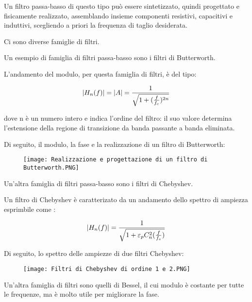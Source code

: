 Un filtro passa-basso di questo tipo può essere sintetizzato, quindi progettato e fisicamente realizzato, assemblando insieme componenti resistivi, capacitivi e induttivi, 
scegliendo a priori la frequenza di taglio desiderata. \newline 

Ci sono diverse famiglie di filtri. \newline 

Un esempio di famiglia di filtri passa-basso sono i filtri di Butterworth. \newline 

L'andamento del modulo, per questa famiglia di filtri, è del tipo: 

{
    \Large 
    \begin{equation}
        \abs{H_n (f)} = \abs{A} = \frac{1}{\sqrt{1+(\frac{f}{f_c})^{2n}}}
    \end{equation}
}

dove n è un numero intero e indica l'ordine del filtro: il suo valore determina l'estensione della regione di transizione da banda passante a banda eliminata. \newline 

Di seguito, il modulo, la fase e la realizzazione di un filtro di Butterworth: 

\begin{figure}[h]
    \centering
    \texttt{[image: Realizzazione e progettazione di un filtro di Butterworth.PNG]}
\end{figure}  

Un'altra famiglia di filtri passa-basso sono i filtri di Chebyshev. \newline 

Un filtro di Chebyshev è caratterizato da un andamento dello spettro di ampiezza esprimbile come : 

{
    \Large 
    \begin{equation}
        \abs{H_n (f)} = \frac{1}{\sqrt{1 + \varepsilon_p C_n ^{2} (\frac{f}{f_s})}}
    \end{equation}
} 

\newpage 

Di seguito, lo spettro delle ampiezze di due filtri Chebyshev: 

\begin{figure}[h]
    \centering
    \texttt{[image: Filtri di Chebyshev di ordine 1 e 2.PNG]}
\end{figure}  

Un'altra famiglia di filtri sono quelli di Bessel, il cui modulo è costante per tutte le frequenze, ma è molto utile per migliorare la fase. \newline 


